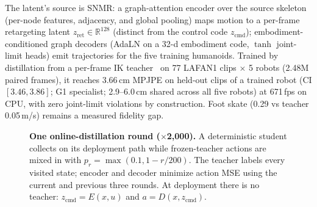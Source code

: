 \documentclass[conference]{IEEEtran}
\newcommand{\zcmd}{\ensuremath{z_{\mathrm{cmd}}}}
\newcommand{\snmr}{SNMR}
\begin{document}
The latent's source is \snmr{}: a graph-attention encoder over the source skeleton
(per-node features, adjacency, and global pooling) maps
motion to a per-frame retargeting latent $z_{\mathrm{ret}}\in\mathbb{R}^{128}$
(distinct from the control code \zcmd{}); embodiment-conditioned graph
decoders (AdaLN on a 32-d embodiment code, $\tanh$ joint-limit heads) emit trajectories
for the five training humanoids. Trained by distillation from a per-frame IK
teacher~\cite{gmr} on 77 LAFAN1 clips $\times$ 5 robots (2.48M paired frames), it
reaches 3.66\,cm MPJPE on held-out clips of a trained robot (CI $[3.46, 3.86]$; G1
specialist; 2.9--6.0\,cm shared
across all five robots) at 671\,fps on CPU, with zero joint-limit violations by
construction. Foot skate (0.29 vs teacher 0.05\,m/s) remains a measured fidelity gap.

\label{sec:method}
\begin{figure}[t]
\centering
{}
\caption{\textbf{One online-distillation round ($\times$2{,}000).} A deterministic student
collects on its deployment path while frozen-teacher actions are mixed in with
$p_r=\max(0.1,1-r/200)$. The teacher labels every visited state; encoder and decoder
minimize action MSE using the current and previous three rounds. At deployment there
is no teacher: $\zcmd=E(x,u)$ and $a=D(x,\zcmd)$.}
\label{fig:loop}
\end{figure}
\end{document}
